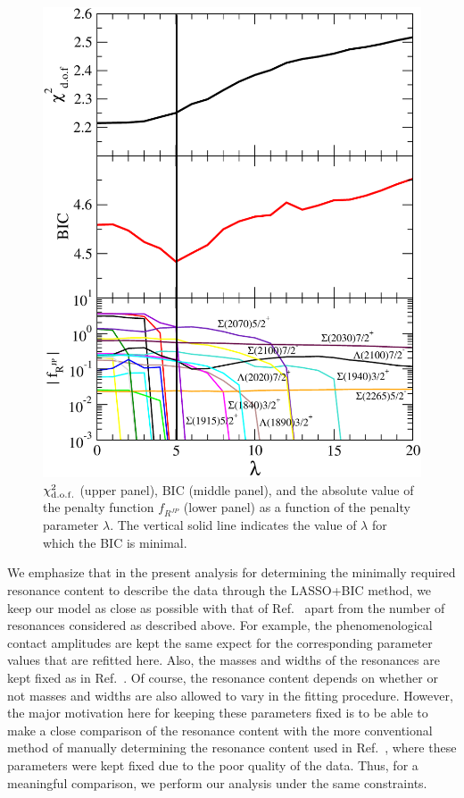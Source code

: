 \documentclass[10pt,aps,prc,superscriptaddress,twoside,twocolumn,nofootinbib,showpacs,preprintnumbers]{revtex4-1}
\begin{document}
\begin{figure}[t]
\includegraphics[width=0.9\linewidth,clip=1]{lasso_pruned_3sigma_BackwardAS_scaledgwidth_no493_g_initial_1_a.pdf}
\caption{$\chi^2_{\rm d.o.f.}$ (upper panel), BIC (middle panel), and the absolute value of the penalty function $f_{R^{JP}}$ (lower panel) as a function of the penalty parameter $\lambda$. The vertical solid line indicates the value of $\lambda$ for which the BIC is minimal.}
\label{fig:KXi-LASSO}
\end{figure}

We emphasize that in the present analysis for determining the minimally required resonance content to describe the data through the LASSO+BIC method, we keep our model as close as possible with that of Ref.~\cite{Jackson:2015dva} apart from the number of resonances considered as described above. For example, the phenomenological contact amplitudes are kept the same expect for the corresponding parameter values 
that are refitted here. Also, the masses and widths of the resonances are kept fixed as in Ref.~\cite{Jackson:2015dva}. Of course, the resonance content depends on whether or not masses and widths are also allowed to vary in the fitting procedure. However, the major motivation here for keeping these parameters fixed is to be able to make a close comparison of the resonance content with the more conventional method of manually determining the resonance content used in Ref.~\cite{Jackson:2015dva}, where these parameters were kept fixed due to the poor quality of the data. Thus, for a meaningful comparison, we perform our analysis under the same constraints.    
\end{document}
